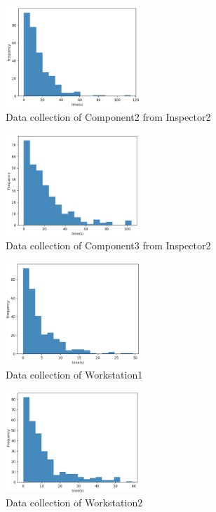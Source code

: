 \documentclass{article}
\begin{document}
\begin{figure}[htbp]
\begin{center}
\includegraphics[width=2in]{dataCollection2.png}
\caption{Data collection of Component2 from Inspector2}
\label{data1}
\end{center}
\end{figure}
\begin{figure}[htbp]
\begin{center}
\includegraphics[width=2in]{dataCollection3.png}
\caption{Data collection of Component3 from Inspector2}
\label{data1}
\end{center}
\end{figure}
\begin{figure}[htbp]
\begin{center}
\includegraphics[width=2in]{dataCollection4.png}
\caption{Data collection of Workstation1}
\label{data1}
\end{center}
\end{figure}
\begin{figure}[htbp]
\begin{center}
\includegraphics[width=2in]{dataCollection5.png}
\caption{Data collection of Workstation2}
\label{data1}
\end{center}
\end{figure}
\end{document}
